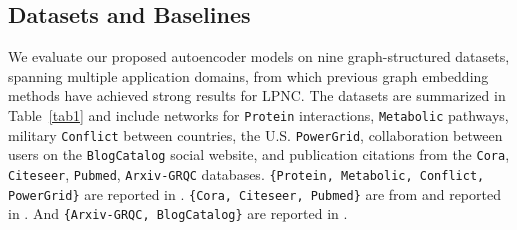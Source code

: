 \documentclass[letterpaper, conference]{IEEEtran}
\begin{document}
\subsection{Datasets and Baselines}
We evaluate our proposed autoencoder models on nine graph-structured datasets, spanning multiple application domains, from which previous graph embedding methods have achieved strong results for LPNC. The datasets are summarized in Table~\ref{tab1} and include networks for \texttt{Protein} interactions, \texttt{Metabolic} pathways, military \texttt{Conflict} between countries, the U.S. \texttt{PowerGrid}, collaboration between users on the \texttt{BlogCatalog} social website, and publication citations from the \texttt{Cora}, \texttt{Citeseer}, \texttt{Pubmed}, \texttt{Arxiv-GRQC} databases. \texttt{\{Protein, Metabolic, Conflict, PowerGrid\}} are reported in \cite{Menon:2011}. \texttt{\{Cora, Citeseer, Pubmed\}} are from \cite{Sen:2008} and reported in \cite{Kipf:2016,VGAE:2016}. And \texttt{\{Arxiv-GRQC, BlogCatalog\}} are reported in \cite{Wang:2016}.
\end{document}
